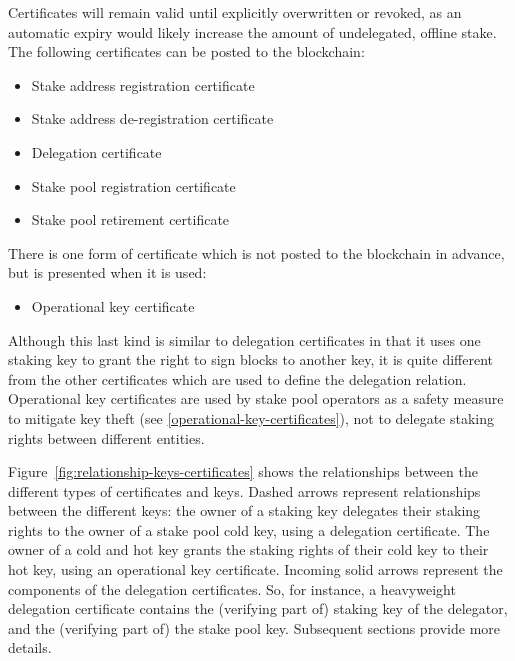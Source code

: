 \documentclass[11pt,a4paper]{article}
\begin{document}
Certificates will remain valid
until explicitly overwritten or revoked, as an automatic expiry would
likely increase the amount of undelegated, offline stake. The following
certificates can be posted to the blockchain:
\begin{itemize}
\item Stake address registration certificate
\item Stake address de-registration certificate
\item Delegation certificate
\item Stake pool registration certificate
\item Stake pool retirement certificate
\end{itemize}
There is one form of certificate which is not posted to the blockchain
in advance, but is presented when it is used:
\begin{itemize}
\item
  Operational key certificate
\end{itemize}
Although this last kind is similar to delegation certificates in that
it uses one staking key to grant the right to sign blocks to another
key, it is quite different from the other certificates which are used
to define the delegation relation. Operational key certificates are
used by stake pool operators as a safety measure to mitigate key
theft (see \cref{operational-key-certificates}), not to delegate
staking rights between different entities.

Figure~\ref{fig:relationship-keys-certificates} shows the relationships between
the different types of certificates and keys.
%
Dashed arrows represent relationships between the different keys: the owner of
a staking key delegates their staking rights to the owner of a stake pool cold
key, using a delegation certificate.
%
The owner of a cold and hot key grants the staking rights of their cold key to their
hot key, using an operational key certificate.
%
Incoming solid arrows represent the components of the delegation certificates.
So, for instance, a heavyweight delegation certificate contains the (verifying
part of) staking key of the delegator, and the (verifying part of) the stake
pool key.
%
Subsequent sections provide more details.
\end{document}
